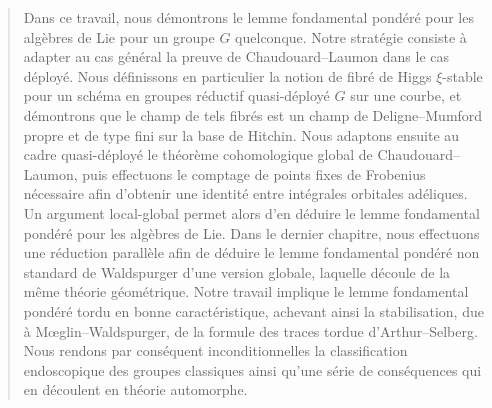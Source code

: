 \begin{abstract}
Dans ce travail, nous démontrons le lemme fondamental pondéré pour les algèbres de Lie pour un groupe $G$ quelconque. Notre stratégie consiste à adapter au cas général la preuve de Chaudouard--Laumon dans le cas déployé. Nous définissons en particulier la notion de fibré de Higgs $\xi$-stable pour un schéma en groupes réductif quasi-déployé $G$ sur une courbe, et démontrons que le champ de tels fibrés est un champ de Deligne--Mumford propre et de type fini sur la base de Hitchin. Nous adaptons ensuite au cadre quasi-déployé le théorème cohomologique global de Chaudouard--Laumon, puis effectuons le comptage de points fixes de Frobenius nécessaire afin d’obtenir une identité entre intégrales orbitales adéliques. Un argument local-global permet alors d’en déduire le lemme fondamental pondéré pour les algèbres de Lie. Dans le dernier chapitre, nous effectuons une réduction parallèle afin de déduire le lemme fondamental pondéré non standard de Waldspurger d’une version globale, laquelle découle de la même théorie géométrique. Notre travail implique le lemme fondamental pondéré tordu en bonne caractéristique, achevant ainsi la stabilisation, due à Mœglin--Waldspurger, de la formule des traces tordue d’Arthur--Selberg. Nous rendons par conséquent inconditionnelles la classification endoscopique des groupes classiques ainsi qu’une série de conséquences qui en découlent en théorie automorphe.

\end{abstract}
